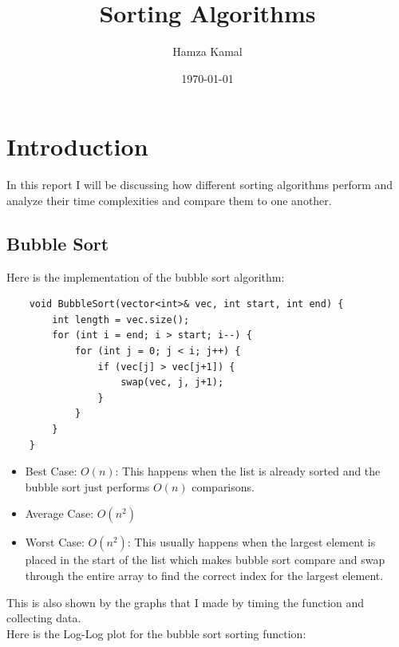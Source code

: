 \documentclass{article}
\title{Sorting Algorithms}
\date{\today}
\author{Hamza Kamal}
\begin{document}
\maketitle
\newpage

\tableofcontents
\newpage

\section{Introduction}
In this report I will be discussing how different sorting algorithms perform and analyze their time complexities and compare them to one another.

\vspace{\baselineskip}
\subsection{Bubble Sort}
Here is the implementation of the bubble sort algorithm:

\begin{verbatim}
    void BubbleSort(vector<int>& vec, int start, int end) {
        int length = vec.size();
        for (int i = end; i > start; i--) {
            for (int j = 0; j < i; j++) {
                if (vec[j] > vec[j+1]) {
                    swap(vec, j, j+1);
                }
            }
        }
    }
\end{verbatim}

\begin{itemize}
    \item Best Case: $O(n)$: This happens when the list is already sorted and the bubble sort just performs $O(n)$ comparisons.
    \item Average Case: $O(n^2)$
    \item Worst Case: $O(n^2)$: This usually happens when the largest element is placed in the start of the list which makes bubble sort compare and swap through the entire array to find the correct index for the largest element.
\end{itemize}

This is also shown by the graphs that I made by timing the function and collecting data. \\

Here is the Log-Log plot for the bubble sort sorting function:
\end{document}
